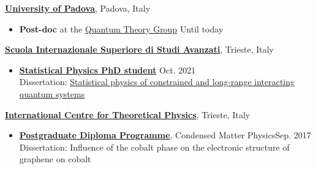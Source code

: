 \documentclass[10pt]{article}
\newenvironment{outerlist}[1][\enskip\textbullet]%
{\begin{itemize}[#1,leftmargin=*]}{\end{itemize}%
\vspace{-.6\baselineskip}}
\newenvironment{innerlist}[1][\enskip\textbullet]%
{\begin{itemize}[#1,leftmargin=*,parsep=0pt,itemsep=0pt,topsep=0pt,partopsep=0pt]}
{\end{itemize}}
\begin{document}

\href{https://www.unipd.it/}{\textbf{University of Padova}},
Padova, Italy
\begin{outerlist}
	\item[]

		\textbf{Post-doc} at the  \href{https://quantum.dfa.unipd.it/}{Quantum Theory Group} \hfill{Until today}\\

	\end{outerlist}
	\vspace{0.5cm}
	\href{https://www.sissa.it/}{\textbf{Scuola Internazionale Superiore di Studi Avanzati}},
	Trieste, Italy
	\begin{outerlist}
	\item[]
		\href{https://www.statphys.sissa.it/wordpress/?page_id=5801}
		{\textbf{Statistical Physics PhD student}}\hfill{ Oct. 2021}\\
		Dissertation: \href{https://hdl.handle.net/20.500.11767/124249}{Statistical physics of constrained and long-range interacting quantum systems}

	\end{outerlist}
	\vspace{0.5cm}
	\href{http://www.ictp.it/}{\textbf{International Centre for Theoretical Physics}},
	Trieste, Italy
	\begin{outerlist}
	\item[]
		\href{http://diploma.ictp.it/}
		{\textbf{Postgraduate Diploma Programme}}, Condensed Matter Physics\hfill{Sep. 2017}\\
		Dissertation: Influence of the cobalt phase on the electronic structure of
		graphene on cobalt

	\end{outerlist}
	\vspace{0.5cm}
\end{document}
